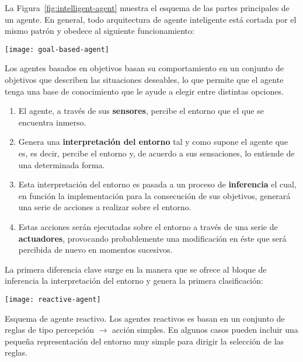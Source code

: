 La Figura~\ref{fig:intelligent-agent} muestra el esquema de las partes principales de un agente. En general, todo arquitectura de agente inteligente está cortada por el mismo patrón y obedece al siguiente funcionamiento:

\begin{marginfigure}
	\texttt{[image: goal-based-agent]}
	\caption[Esquema de agente basado en objetivos]{Los agentes basados en objetivos basan su comportamiento en un conjunto de objetivos que describen las situaciones deseables, lo que permite que el agente tenga una base de conocimiento que le ayude a elegir entre distintas opciones.}
	\label{fig:goal-based-agent}
\end{marginfigure}

\begin{enumerate}
	\item El agente, a través de sus \textbf{sensores}, percibe el entorno que el que se encuentra inmerso.
	\item Genera una \textbf{interpretación del entorno} tal y como supone el agente que es, es decir, percibe el entorno y, de acuerdo a sus sensaciones, lo entiende de una determinada forma.
	\item Esta interpretación del entorno es pasada a un proceso de \textbf{inferencia} el cual, en función la implementación para la consecución de sus objetivos, generará una serie de acciones a realizar sobre el entorno.
	\item Estas acciones serán ejecutadas sobre el entorno a través de una serie de \textbf{actuadores}, provocando probablemente una modificación en éste que será percibida de nuevo en momentos sucesivos.
\end{enumerate}

La primera diferencia clave surge en la manera que se ofrece al bloque de inferencia la interpretación del entorno y genera la primera clasificación:

\begin{marginfigure}
	\texttt{[image: reactive-agent]}
	\caption[Esquema de agente reactivo]{Esquema de agente reactivo. Los agentes reactivos es basan en un conjunto de reglas de tipo percepción $\rightarrow$ acción simples. En algunos casos pueden incluir una pequeña representación del entorno muy simple para dirigir la selección de las reglas.}
	\label{fig:reactive-agent}
\end{marginfigure}

